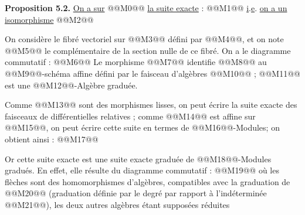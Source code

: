 
\textbf{Proposition 5.2.} \uline{On a sur} @@M0@@ \uline{la suite exacte} :
@@M1@@
\uline{i}.\uline{e}. \uline{on a un isomorphisme}
@@M2@@

On considère le fibré vectoriel sur @@M3@@ défini par @@M4@@, et on note @@M5@@ le complémentaire de la section nulle de ce fibré. On a le diagramme commutatif :
@@M6@@
Le morphisme @@M7@@ identifie @@M8@@ au @@M9@@-schéma affine défini par le faisceau d'algèbres @@M10@@ ; @@M11@@ est une @@M12@@-Algèbre graduée.

Comme @@M13@@ sont des morphismes lisses, on peut écrire la suite exacte des faisceaux de différentielles relatives ; comme @@M14@@ est affine sur @@M15@@, on peut écrire cette suite en termes de @@M16@@-Modules; on obtient ainsi :
@@M17@@

Or cette suite exacte est une suite exacte graduée de @@M18@@-Modules gradués. En effet, elle résulte du diagramme commutatif :
@@M19@@
où les flèches sont des homomorphismes d'algèbres, compatibles avec la graduation de @@M20@@ (graduation définie par le degré par rapport à l'indéterminée @@M21@@), les deux autres algèbres étant supposées réduites
